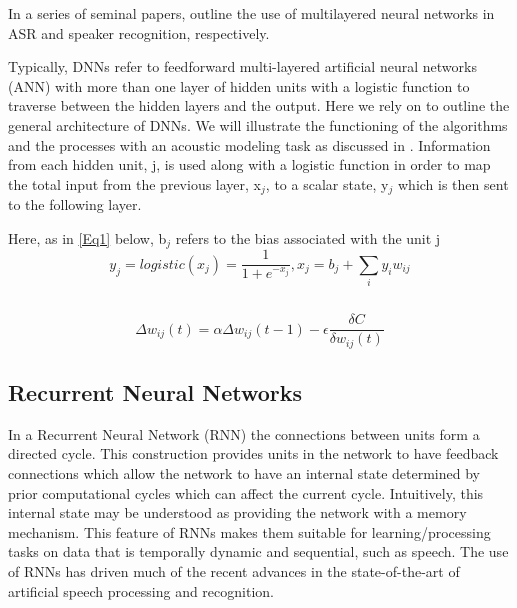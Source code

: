 \documentclass{article}[12pt]
\begin{document}
In a series of seminal papers, \cite{bengio1989_acm,bengio1989} outline the use of multilayered neural networks in ASR and speaker recognition, respectively.


Typically, DNNs refer to feedforward multi-layered artificial neural networks (ANN) with more than one layer of hidden units with a logistic function to traverse between the hidden layers and the output. Here we rely on \cite{hinton2012} to outline the general architecture of DNNs. We will illustrate the functioning of the algorithms and the processes with an acoustic modeling task as discussed in \cite{hinton2012}. Information from each hidden unit, j, is used along with a logistic function in order to map the total input from the previous layer, x$_j$, to a scalar state, y$_j$ which is then sent to the following layer.

Here, as in \ref{Eq1} below, b$_j$ refers to the bias associated with the unit j
\begin{equation}
y_{j}=logistic(x_{j})=\frac{1}{1+e^{-x_{j}}}, x_{j} = b_{j} + \sum_{i}y_{i}w_{ij}
\label{Eq1}
\end{equation}

\begin{equation}
\label{Eq2}
\end{equation}

\begin{equation}
\label{Eq3}
\end{equation}
\begin{equation}
\Delta w_{ij}(t)=\alpha\Delta w_{ij}(t-1) - \epsilon \frac{\delta C}{\delta w_{ij}(t)}
\label{Eq4}
\end{equation}

\subsection{Recurrent Neural Networks}
In a Recurrent Neural Network (RNN) the connections between units form a directed cycle. This construction provides units in the network to have feedback connections which allow the network to have an internal state determined by prior computational cycles which can affect the current cycle. Intuitively, this internal state may be understood as providing the network with a memory mechanism. This feature of RNNs makes them suitable for learning/processing tasks on data that is temporally dynamic and sequential, such as speech. The use of RNNs has driven much of the recent advances in the state-of-the-art of artificial speech processing and recognition.
\end{document}
